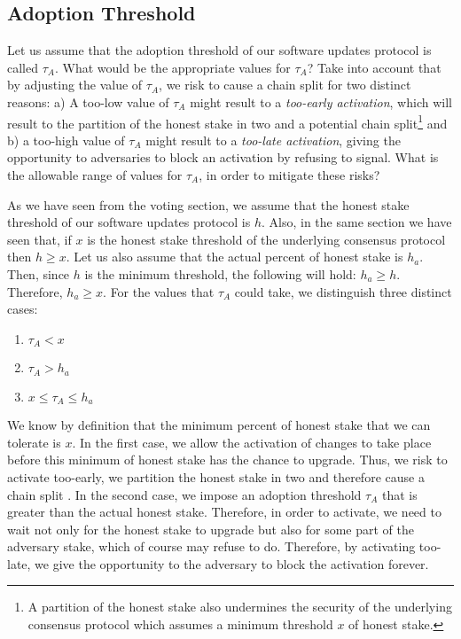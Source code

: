 \subsection{Adoption Threshold} \label{appxadoption}
Let us assume that the adoption threshold of our software updates protocol is called $\tau_A$. %
What would be the appropriate values for $\tau_A$? Take into account that by adjusting the value of $\tau_A$, we risk to cause a chain split for two distinct reasons: a) A too-low value of $\tau_A$ might result to a \emph{too-early activation}, which will result to the partition of the honest stake in two and a potential chain split\footnote{A partition of the honest stake also undermines the security of the underlying consensus protocol which assumes a minimum threshold $x$ of honest stake.}  and b) a too-high value of $\tau_A$ might result to a \emph{too-late activation}, giving the opportunity to adversaries to block an activation by refusing to signal. %
What is the allowable range of values for $\tau_A$, in order to mitigate these risks?

As we have seen from the voting section, we assume that the honest stake threshold of our software updates protocol is $h$. Also, in the same section we have seen that, if $x$ is the honest stake threshold of the underlying consensus protocol then $h \geq x$. Let us also assume that the actual percent of honest stake is $h_a$. Then, since $h$ is the minimum threshold, the following will hold: $ h_a \geq h$. Therefore, $h_a \geq x$. For the values that $\tau_A$ could take, we distinguish three distinct cases:
\begin{enumerate}
\item $\tau_A < x$
\item $\tau_A > h_a$
\item $ x \leq \tau_A \leq h_a$
\end{enumerate}
We know by definition that the minimum percent of honest stake that we can tolerate is $x$. In the first case, we allow the activation of changes to take place before this minimum of honest stake has the chance to upgrade. Thus, we risk to activate too-early, we partition the honest stake in two and therefore cause a chain split . In the second case, we impose an adoption threshold $\tau_A$ that is greater than the actual honest stake. Therefore, in order to activate, we need to wait not only for the honest stake to upgrade but also for some part of the adversary stake, which of course may refuse to do. Therefore, by activating too-late, we give the opportunity to the adversary to block the activation forever.

